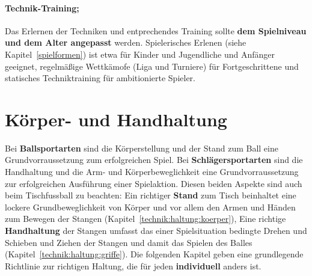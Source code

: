 \paragraph{Technik-Training;} 
Das Erlernen der Techniken und entprechendes Training sollte \textbf{dem Spielniveau und dem Alter angepasst} werden. 
Spielerisches Erlenen (siehe Kapitel~\ref{spielformen}) ist etwa für Kinder und Jugendliche und Anfänger geeignet, regelmäßige Wettkämofe (Liga und Turniere) für Fortgeschrittene und statisches Techniktraining für ambitionierte Spieler.


\section{Körper- und Handhaltung}
\label{technik:haltung}

Bei \textbf{Ballsportarten} sind die Körperstellung und der Stand zum Ball eine Grundvorraussetzung zum erfolgreichen Spiel.
Bei \textbf{Schlägersportarten} sind die Handhaltung und die Arm- und Körperbeweglichkeit eine Grundvorraussetzung zur erfolgreichen Ausführung einer Spielaktion.
Diesen beiden Aspekte sind auch beim Tischfussball zu beachten:
Ein richtiger \textbf{Stand} zum Tisch beinhaltet eine lockere Grundbeweglichkeit von Körper und vor allem den Armen und Händen zum Bewegen der Stangen (Kapitel~\ref{technik:haltung:koerper}),
Eine richtige \textbf{Handhaltung} der Stangen umfasst das einer Spielsituation bedingte Drehen und Schieben und Ziehen der Stangen und damit das Spielen des Balles (Kapitel~\ref{technik:haltung:griffe}).
Die folgenden Kapitel geben eine grundlegende Richtlinie zur richtigen Haltung, die für jeden \textbf{individuell} anders ist. 

